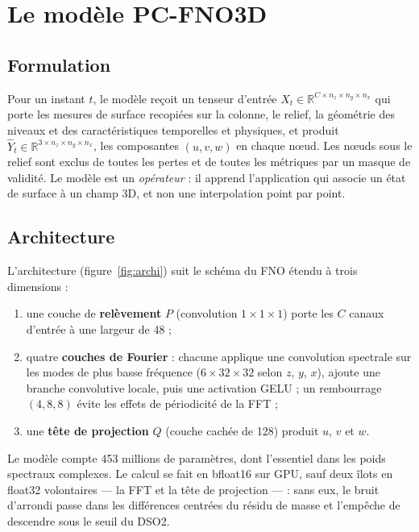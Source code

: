 \chapter{Le modèle PC-FNO3D}
\label{chap:modele}

\section{Formulation}
Pour un instant $t$, le modèle reçoit un tenseur d'entrée $X_t \in \mathbb{R}^{C\times n_z\times
n_y\times n_x}$ qui porte les mesures de surface recopiées sur la colonne, le relief, la géométrie
des niveaux et des caractéristiques temporelles et physiques, et produit
$\hat Y_t \in \mathbb{R}^{3\times n_z\times n_y\times n_x}$, les composantes $(u, v, w)$ en chaque
nœud. Les nœuds sous le relief sont exclus de toutes les pertes et de toutes les métriques par un
masque de validité. Le modèle est un \emph{opérateur} : il apprend l'application qui associe un
état de surface à un champ 3D, et non une interpolation point par point.

\section{Architecture}
L'architecture (figure~\ref{fig:archi}) suit le schéma du FNO \citep{li2021fno} étendu à trois
dimensions :
\begin{enumerate}
  \item une couche de \textbf{relèvement} $P$ (convolution $1\times1\times1$) porte les $C$ canaux
        d'entrée à une largeur de 48 ;
  \item quatre \textbf{couches de Fourier} : chacune applique une convolution spectrale sur les
        modes de plus basse fréquence ($6\times32\times32$ selon $z$, $y$, $x$), ajoute une branche
        convolutive locale, puis une activation GELU ; un rembourrage $(4, 8, 8)$ évite les effets
        de périodicité de la FFT ;
  \item une \textbf{tête de projection} $Q$ (couche cachée de 128) produit $u$, $v$ et $w$.
\end{enumerate}
Le modèle compte 453 millions de paramètres, dont l'essentiel dans les poids spectraux complexes.
Le calcul se fait en bfloat16 sur GPU, sauf deux îlots en float32 volontaires --- la FFT et la tête
de projection --- : sans eux, le bruit d'arrondi passe dans les différences centrées du résidu de
masse et l'empêche de descendre sous le seuil du DSO2.

